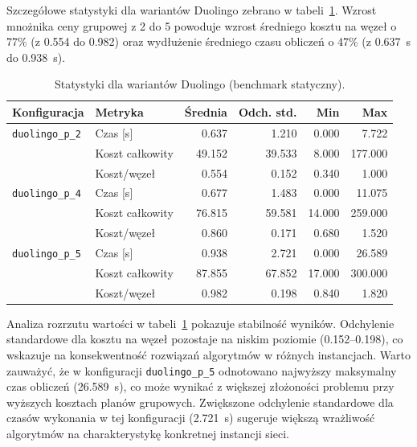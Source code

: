 Szczegółowe statystyki dla wariantów Duolingo zebrano w tabeli~\ref{tab:ext-duolingo-stats}. Wzrost mnożnika ceny grupowej z 2 do 5 powoduje wzrost średniego kosztu na węzeł o 77\% (z 0.554 do 0.982) oraz wydłużenie średniego czasu obliczeń o 47\% (z \SI{0.637}{\second} do \SI{0.938}{\second}).

\begin{table}[H]
    \centering
    \caption{Statystyki dla wariantów Duolingo (benchmark statyczny).}
    \label{tab:ext-duolingo-stats}
    \begin{tabular}{llrrrr}
        \toprule
        \textbf{Konfiguracja}   & \textbf{Metryka} & \textbf{Średnia} & \textbf{Odch. std.} & \textbf{Min} & \textbf{Max} \\
        \midrule
        \texttt{duolingo\_p\_2} & Czas [s]         & 0.637            & 1.210               & 0.000        & 7.722        \\
                                & Koszt całkowity  & 49.152           & 39.533              & 8.000        & 177.000      \\
                                & Koszt/węzeł      & 0.554            & 0.152               & 0.340        & 1.000        \\
        \midrule
        \texttt{duolingo\_p\_4} & Czas [s]         & 0.677            & 1.483               & 0.000        & 11.075       \\
                                & Koszt całkowity  & 76.815           & 59.581              & 14.000       & 259.000      \\
                                & Koszt/węzeł      & 0.860            & 0.171               & 0.680        & 1.520        \\
        \midrule
        \texttt{duolingo\_p\_5} & Czas [s]         & 0.938            & 2.721               & 0.000        & 26.589       \\
                                & Koszt całkowity  & 87.855           & 67.852              & 17.000       & 300.000      \\
                                & Koszt/węzeł      & 0.982            & 0.198               & 0.840        & 1.820        \\
        \bottomrule
    \end{tabular}
\end{table}



Analiza rozrzutu wartości w tabeli~\ref{tab:ext-duolingo-stats} pokazuje stabilność wyników. Odchylenie standardowe dla kosztu na węzeł pozostaje na niskim poziomie (0.152--0.198), co wskazuje na konsekwentność rozwiązań algorytmów w różnych instancjach. Warto zauważyć, że w konfiguracji \texttt{duolingo\_p\_5} odnotowano najwyższy maksymalny czas obliczeń (\SI{26.589}{\second}), co może wynikać z większej złożoności problemu przy wyższych kosztach planów grupowych. Zwiększone odchylenie standardowe dla czasów wykonania w tej konfiguracji (\SI{2.721}{\second}) sugeruje większą wrażliwość algorytmów na charakterystykę konkretnej instancji sieci.

